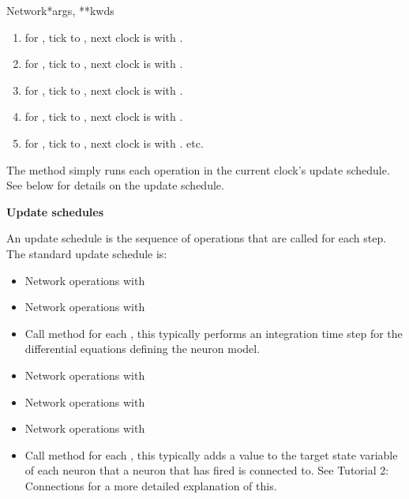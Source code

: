 \documentclass[letterpaper,10pt,english]{manual}
\begin{document}
\begin{classdesc}{Network}{*args, **kwds}
\begin{enumerate}
\item {} 
 for , tick  to , next
clock is  with .

\item {} 
 for , tick  to , next
clock is  with .

\item {} 
 for , tick  to , next
clock is  with .

\item {} 
 for , tick  to , next
clock is  with .

\item {} 
 for , tick  to , next
clock is  with . etc.

\end{enumerate}

The  method simply runs each operation in the current clock's
update schedule. See below for details on the update schedule.

\textbf{Update schedules}

An update schedule is the sequence of operations that are
called for each  step. The standard update schedule is:
\begin{itemize}
\item {} 
Network operations with 

\item {} 
Network operations with 

\item {} 
Call  method for each \hyperlink{brian.NeuronGroup}{}, this typically
performs an integration time step for the differential equations
defining the neuron model.

\item {} 
Network operations with 

\item {} 
Network operations with 

\item {} 
Network operations with 

\item {} 
Call  method for each \hyperlink{brian.Connection}{}, this
typically adds a value to the target state variable of each neuron
that a neuron that has fired is connected to. See Tutorial 2: Connections for
a more detailed explanation of this.


\end{itemize}
\end{classdesc}
\end{document}
